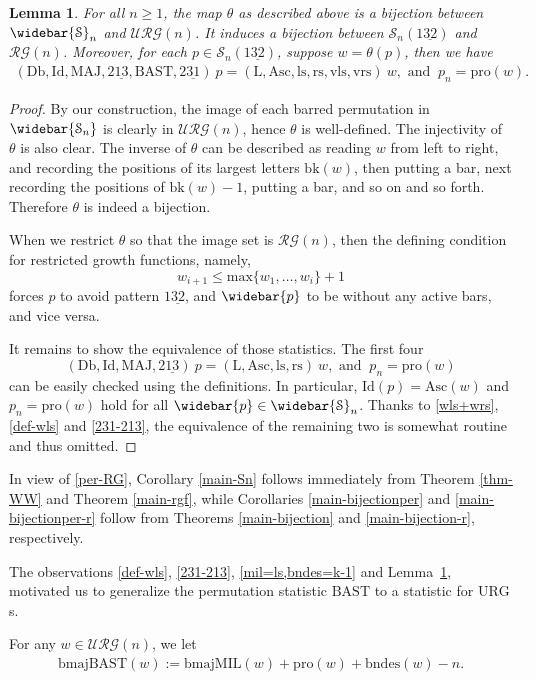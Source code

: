 \documentclass[12pt]{amsart}
\numberwithin{equation}{section}
\theoremstyle{plain}
\newtheorem{lemma}[theorem]{Lemma}
\theoremstyle{definition}
\def\MAJ{\mathrm{MAJ}}
\def\BAST{\mathrm{BAST}}
\def\bk{\mathrm{bk}}
\def\bmajMIL{\mathrm{bmajMIL}}
\def\bmajBAST{\mathrm{bmajBAST}}
\def\bndes{\mathrm{bndes}}
\def\ls{\mathrm{ls}}
\def\rs{\mathrm{rs}}
\def\wrs{\mathrm{vrs}}
\def\wls{\mathrm{vls}}
\def\pl{\mathrm{pro}}
\def\Asc{\mathrm{Asc}}
\def\LL{\mathrm{L}}
\def\Db{\mathrm{Db}}
\def\Id{\mathrm{Id}}
\def\max{\mathrm{max}}
\def\SS{\mathcal{S}}
\def\RG{\mathcal{RG}}
\def\URG{\mathcal{URG}}
\begin{document}
\begin{lemma}\label{lem-rgf2per}
For all $n\ge 1$, the map $\theta$ as described above is a bijection between $\widebar{\SS}_n$ and $\URG(n)$. It induces a bijection between $\SS_n(1\underline{32})$ and $\RG(n)$. Moreover, for each $p\in\SS_n(1\underline{32})$, suppose $w=\theta(p)$, then we have
 \begin{align}\label{per-RG}
 (\Db,\Id,\MAJ,2\underline{13},\BAST,2\underline{31})~p = (\LL,\Asc,\ls,\rs,\wls,\wrs)~ w, \text{ and }~p_n=\pl(w).
 \end{align}
\end{lemma}
\begin{proof}
By our construction, the image of each barred permutation in $\widebar{\SS_n}$ is clearly in $\URG(n)$, hence $\theta$ is well-defined. The injectivity of $\theta$ is also clear. The inverse of $\theta$ can be described as reading $w$ from left to right, and recording the positions of its largest letters $\bk(w)$, then putting a bar, next recording the positions of $\bk(w)-1$, putting a bar, and so on and so forth. Therefore $\theta$ is indeed a bijection.

When we restrict $\theta$ so that the image set is $\RG(n)$, then the defining condition for restricted growth functions, namely, $$w_{i+1}\le \max\{w_1,\ldots,w_i\}+1$$ forces $p$ to avoid pattern $1\underline{32}$, and $\widebar{p}$ to be without any active bars, and vice versa.

It remains to show the equivalence of those statistics. The first four $$(\Db,\Id,\MAJ,2\underline{13})~p=(\LL,\Asc,\ls,\rs)~w, \text{ and }~p_n=\pl(w)$$ can be easily checked using the definitions. In particular, $\Id(p)=\Asc(w)$ and $p_n=\pl(w)$ hold for all $\widebar{p}\in\widebar{\SS}_n$. Thanks to \eqref{wls+wrs}, \eqref{def-wls} and \eqref{231-213}, the equivalence of the remaining two is somewhat routine and thus omitted.
\end{proof}
In view of \eqref{per-RG},
Corollary \ref{main-Sn} follows  immediately from
Theorem \ref{thm-WW} and  Theorem \ref{main-rgf},
while Corollaries \ref{main-bijectionper} and \ref{main-bijectionper-r} follow from
Theorems \ref{main-bijection} and \ref{main-bijection-r}, respectively.

The observations \eqref{def-wls}, \eqref{231-213}, \eqref{mil=ls,bndes=k-1} and Lemma~\ref{lem-rgf2per}, motivated us to generalize the permutation statistic $\BAST$ to a statistic for $\mathrm{URG}$s.

For any $w\in\URG(n)$, we let
\begin{align}\label{def-bmajbast}
\bmajBAST(w):=\bmajMIL(w)+\pl(w)+\bndes(w)-n.
\end{align}
\end{document}
